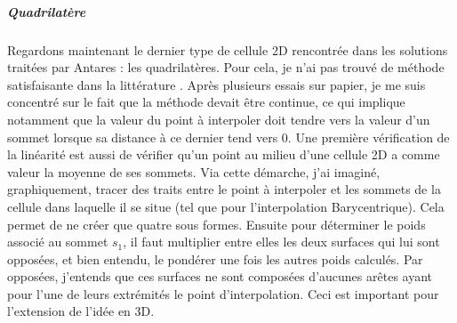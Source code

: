 \subparagraph{Quadrilatère}

Regardons maintenant le dernier type de cellule 2D rencontrée dans les solutions traitées par Antares : les quadrilatères.
Pour cela, je n'ai pas trouvé de méthode satisfaisante dans la littérature \cite{perronnet1998}. Après plusieurs essais sur papier, je me suis concentré sur le fait que la méthode devait être continue, ce qui implique notamment que la valeur du point à interpoler doit tendre vers la valeur d'un sommet lorsque sa distance à ce dernier tend vers 0.
Une première vérification de la linéarité est aussi de vérifier qu'un point au milieu d'une cellule 2D a comme valeur la moyenne de ses sommets.
Via cette démarche, j'ai imaginé, graphiquement, tracer des traits entre le point à interpoler et les sommets de la cellule dans laquelle il se situe (tel que pour l'interpolation Barycentrique).
Cela permet de ne créer que quatre sous formes.
Ensuite pour déterminer le poids associé au sommet \( s_1 \), il faut multiplier entre elles les deux surfaces qui lui sont opposées, et bien entendu, le pondérer une fois les autres poids calculés.
Par opposées, j'entends que ces surfaces ne sont composées d'aucunes arêtes ayant pour l'une de leurs extrémités le point d'interpolation. Ceci est important pour l'extension de l'idée en 3D.

